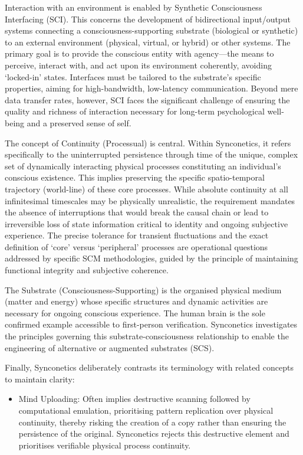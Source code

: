 \documentclass[10pt]{article}
\begin{document}
\begin{sloppypar}
  Interaction with an environment is enabled by Synthetic Consciousness Interfacing (SCI). This concerns the development of bidirectional input/output systems connecting a consciousness-supporting substrate (biological or synthetic) to an external environment (physical, virtual, or hybrid) or other systems. The primary goal is to provide the conscious entity with agency—the means to perceive, interact with, and act upon its environment coherently, avoiding ‘locked-in’ states. Interfaces must be tailored to the substrate’s specific properties, aiming for high-bandwidth, low-latency communication. Beyond mere data transfer rates, however, SCI faces the significant challenge of ensuring the quality and richness of interaction necessary for long-term psychological well-being and a preserved sense of self.

  The concept of Continuity (Processual) is central. Within Synconetics, it refers specifically to the uninterrupted persistence through time of the unique, complex set of dynamically interacting physical processes constituting an individual’s conscious existence. This implies preserving the specific spatio-temporal trajectory (world-line) of these core processes. While absolute continuity at all infinitesimal timescales may be physically unrealistic, the requirement mandates the absence of interruptions that would break the causal chain or lead to irreversible loss of state information critical to identity and ongoing subjective experience. The precise tolerance for transient fluctuations and the exact definition of ‘core’ versus ‘peripheral’ processes are operational questions addressed by specific SCM methodologies, guided by the principle of maintaining functional integrity and subjective coherence.

  The Substrate (Consciousness-Supporting) is the organised physical medium (matter and energy) whose specific structures and dynamic activities are necessary for ongoing conscious experience. The human brain is the sole confirmed example accessible to first-person verification. Synconetics investigates the principles governing this substrate-consciousness relationship to enable the engineering of alternative or augmented substrates (SCS).

  Finally, Synconetics deliberately contrasts its terminology with related concepts to maintain clarity:

  \begin{itemize}
    \item Mind Uploading: Often implies destructive scanning followed by computational emulation, prioritising pattern replication over physical continuity, thereby risking the creation of a copy rather than ensuring the persistence of the original. Synconetics rejects this destructive element and prioritises verifiable physical process continuity.


\end{itemize}
\end{sloppypar}
\end{document}
